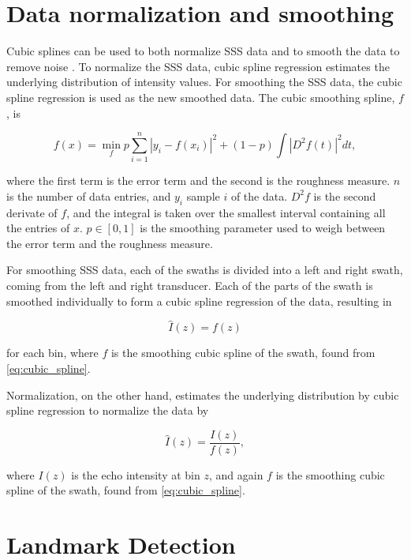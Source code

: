 \section{Data normalization and smoothing}

Cubic splines can be used to both normalize SSS data \cite{ReitanHogstad2022Side-ScanAutonomy} and to smooth the data to remove noise \cite{Al-Rawi2017LandmarkImages}. To normalize the SSS data, cubic spline regression estimates the underlying distribution of intensity values. For smoothing the SSS data, the cubic spline regression is used as the new smoothed data. The cubic smoothing spline, $f$, is 

\begin{equation}
    {f}(x) = \min_{f} p \sum_{i=1}^n |y_i-f(x_i)|^2 + (1-p) \int|D^2f(t)|^2dt,
    \label{eq:cubic_spline}
\end{equation}

where the first term is the error term and the second is the roughness measure. $n$ is the number of data entries, and $y_i$ sample $i$ of the data. $D^2f$ is the second derivate of $f$, and the integral is taken over the smallest interval containing all the entries of $x$. $p \in [0,1]$ is the smoothing parameter used to weigh between the error term and the roughness measure. 

For smoothing SSS data, each of the swaths is divided into a left and right swath, coming from the left and right transducer. Each of the parts of the swath is smoothed individually to form a cubic spline regression of the data, resulting in

\begin{equation}
    \hat{I}(z) = f(z)
    \label{eq:swath_smoothing}
\end{equation}

for each bin, where $f$ is the smoothing cubic spline of the swath, found from \cref{eq:cubic_spline}.

Normalization, on the other hand, estimates the underlying distribution by cubic spline regression to normalize the data by

\begin{equation}
    \hat{I}(z) = \frac{I(z)}{f(z)},
    \label{eq:swath_norm}
\end{equation}

where $I(z)$ is the echo intensity at bin $z$, and again $f$ is the smoothing cubic spline of the swath, found from \cref{eq:cubic_spline}.

\section{Landmark Detection}


